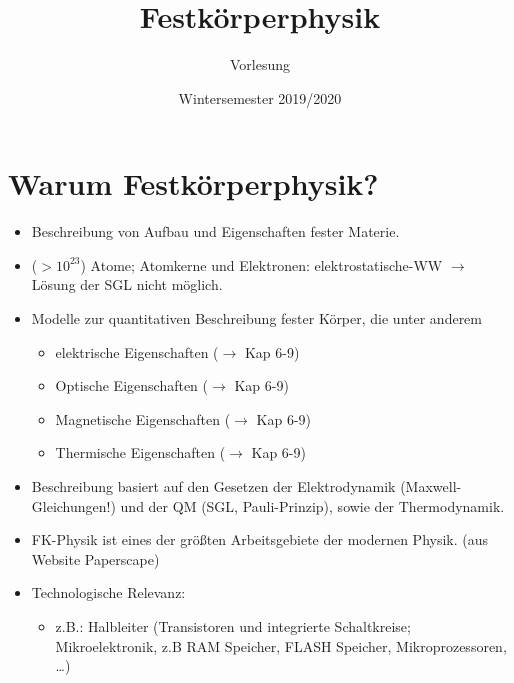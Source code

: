 


\title{Festkörperphysik}
\author{Vorlesung} %
\date{Wintersemester 2019/2020}



\maketitle \newpage
\tableofcontents
\newpage

\section*{Warum Festkörperphysik?}
	\begin{itemize}
	    \item Beschreibung von Aufbau und Eigenschaften fester Materie.
	    \item ($>10^{23}$) Atome; Atomkerne und Elektronen: elektrostatische-WW $ \rightarrow $ Lösung der SGL nicht möglich.
	    \item Modelle zur quantitativen Beschreibung fester Körper, die unter anderem
	    \begin{itemize}
	        \item elektrische Eigenschaften ($\rightarrow$ Kap 6-9)%
	        \item Optische Eigenschaften ($\rightarrow$ Kap 6-9)%
	        \item Magnetische Eigenschaften ($\rightarrow$ Kap 6-9)%
	        \item Thermische Eigenschaften ($\rightarrow$ Kap 6-9)%
	    \end{itemize}
	    \item Beschreibung basiert auf den Gesetzen der Elektrodynamik (Maxwell-Gleichungen!) und der QM (SGL, Pauli-Prinzip), sowie der Thermodynamik.
	    \item FK-Physik ist eines der größten Arbeitsgebiete der modernen Physik. (aus Website Paperscape)
	    \item Technologische Relevanz:
	    \begin{itemize}
	        \item z.B.: Halbleiter (Transistoren und integrierte Schaltkreise; Mikroelektronik, z.B RAM Speicher, FLASH Speicher, Mikroprozessoren, \dots)

\end{itemize}
\end{itemize}
